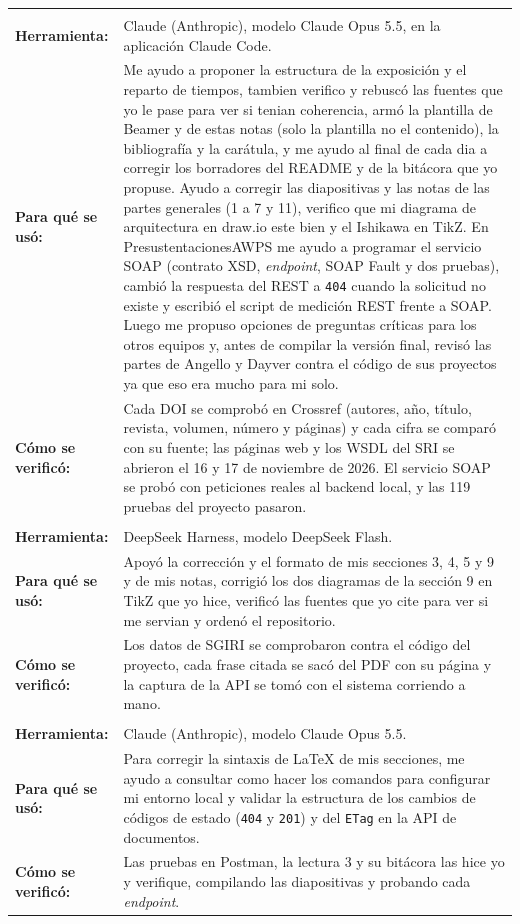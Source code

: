 \documentclass[10pt,a4paper]{article}
\begin{document}
\small
\noindent
\begin{tabularx}{\textwidth}{@{}>{\bfseries}l >{\raggedright\arraybackslash}X@{}}
  \multicolumn{2}{@{}l}{\textbf{Dariem Benites}} \\
  Herramienta: & Claude (Anthropic), modelo Claude Opus 5.5, en la aplicación Claude Code. \\
  Para qué se usó: & Me ayudo a proponer la estructura de la exposición y el reparto de tiempos, tambien verifico y rebuscó las fuentes que yo le pase para ver si tenian coherencia, armó la plantilla de Beamer y de estas notas (solo la plantilla no el contenido), la bibliografía y la carátula, y me ayudo al final de cada dia a corregir los borradores del README y de la bitácora que yo propuse. Ayudo a corregir las diapositivas y las notas de las partes generales (1 a 7 y 11), verifico que mi diagrama de arquitectura en draw.io este bien y el Ishikawa en TikZ. En PresustentacionesAWPS me ayudo a programar el servicio SOAP (contrato XSD, \emph{endpoint}, SOAP Fault y dos pruebas), cambió la respuesta del REST a \texttt{404} cuando la solicitud no existe y escribió el script de medición REST frente a SOAP. Luego me propuso opciones de preguntas críticas para los otros equipos y, antes de compilar la versión final, revisó las partes de Angello y Dayver contra el código de sus proyectos ya que eso era mucho para mi solo. \\
  Cómo se verificó: & Cada DOI se comprobó en Crossref (autores, año, título, revista, volumen, número y páginas) y cada cifra se comparó con su fuente; las páginas web y los WSDL del SRI se abrieron el 16 y 17 de noviembre de 2026. El servicio SOAP se probó con peticiones reales al backend local, y las 119 pruebas del proyecto pasaron. \\[4pt]
  \multicolumn{2}{@{}l}{\textbf{Angello Mendoza}} \\
  Herramienta: & DeepSeek Harness, modelo DeepSeek Flash. \\
  Para qué se usó: & Apoyó la corrección y el formato de mis secciones 3, 4, 5 y 9 y de mis notas, corrigió los dos diagramas de la sección 9 en TikZ que yo hice, verificó las fuentes que yo cite para ver si me servian y ordenó el repositorio. \\
  Cómo se verificó: & Los datos de SGIRI se comprobaron contra el código del proyecto, cada frase citada se sacó del PDF con su página y la captura de la API se tomó con el sistema corriendo a mano. \\[4pt]
  \multicolumn{2}{@{}l}{\textbf{Dayver Rivas}} \\
  Herramienta: & Claude (Anthropic), modelo Claude Opus 5.5. \\
  Para qué se usó: & Para corregir la sintaxis de \LaTeX{} de mis secciones, me ayudo a consultar como hacer los comandos para configurar mi entorno local y validar la estructura de los cambios de códigos de estado (\texttt{404} y \texttt{201}) y del \texttt{ETag} en la API de documentos. \\
  Cómo se verificó: & Las pruebas en Postman, la lectura 3 y su bitácora las hice yo y verifique, compilando las diapositivas y probando cada \emph{endpoint}. \\
\end{tabularx}
\normalsize
\end{document}
